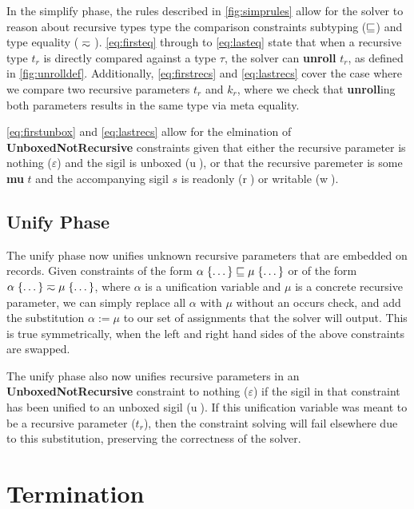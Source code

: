 In the simplify phase, the rules described in \autoref{fig:simprules} allow for
the solver to reason about recursive types type the comparison constraints
subtyping ($\sqsubseteq$) and type equality ($\typeeq$). \autoref{eq:firsteq}
through to \autoref{eq:lasteq} state that
when a recursive type $t_r$ is directly compared against a type $\tau$, the solver
can \textbf{unroll} $t_r$, as defined in \autoref{fig:unrolldef}.
Additionally, \autoref{eq:firstrecs} and \autoref{eq:lastrecs} 
cover the case where we compare two recursive parameters
$t_r$ and $k_r$, where we check that \textbf{unroll}ing both parameters results
in the same type via meta equality.

\autoref{eq:firstunbox} and \autoref{eq:lastrecs} allow for the elmination of \textbf{UnboxedNotRecursive} constraints
given that either the recursive parameter is nothing ($\varepsilon$) and the sigil is
unboxed (\textcircled{u}), or that the recursive paremeter is some \textbf{mu} $t$ and
the accompanying sigil $s$ is readonly (\textcircled{r}) or writable (\textcircled{w}).

\subsection{Unify Phase}

The unify phase now unifies unknown recursive parameters that are embedded
on records. Given constraints of the form 
$\alpha\; \{ \dots \} \sqsubseteq \mu\; \{ \dots \}$ or of the form
$\alpha\; \{ \dots \} \typeeq \mu\; \{ \dots \}$, where $\alpha$ is a unification
variable and $\mu$ is a concrete recursive parameter, we can simply replace all
$\alpha$ with $\mu$ without an occurs check, and add the substitution 
$\alpha := \mu$ to our set of assignments that the solver will output. 
This is true symmetrically, when the left and right hand sides of the above
constraints are swapped.

The unify phase also now unifies recursive parameters in an \textbf{UnboxedNotRecursive}
constraint to nothing ($\varepsilon$) if the sigil in that constraint has been unified to
an unboxed sigil (\textcircled{u}). If this unification variable was meant to be a recursive
parameter ($t_r$), then the constraint solving will fail elsewhere due to this substitution,
preserving the correctness of the solver.

\section{Termination}


